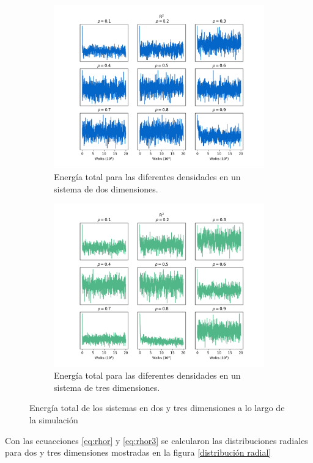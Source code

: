\documentclass[reprint,amsmath,amssymb,aps,]{revtex4-2}
\begin{document}
\begin{figure}[H]
    \centering
    \begin{subfigure}[b]{\linewidth}
    \includegraphics[scale=0.35]{../Graphics/Energy_2.png}
    \caption{Energía total para las diferentes densidades en un sistema de dos dimensiones.}
    \end{subfigure}
    \begin{subfigure}[b]{\linewidth}
        \includegraphics[scale=0.35]{../Graphics/Energy_3.png}
        \caption{Energía total para las diferentes densidades en un sistema de tres dimensiones.}
    \end{subfigure}
    \caption{Energía total de los sistemas en dos y tres dimensiones a lo largo de la simulación}
    \label{energias}
\end{figure}
Con las ecuacciones \ref{eq:rhor} y \ref{eq:rhor3} se calcularon las distribuciones radiales para dos y tres dimensiones mostradas en la figura \ref{distribución radial}
\end{document}
